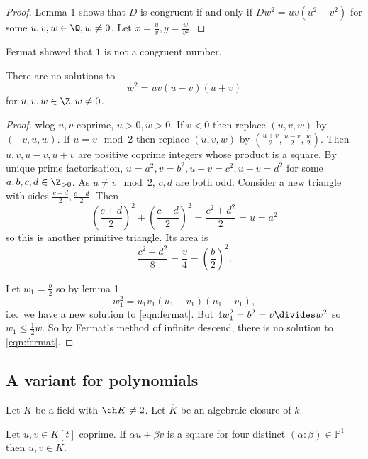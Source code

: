 \documentclass[a4paper]{article}
\theoremstyle{definition}
\renewcommand*{\P}{\mathbb{P}}
\begin{document}
\begin{proof}
  Lemma 1 shows that \(D\) is congruent if and only if \(Dw^2 = uv(u^2 - v^2)\) for some \(u, v, w \in \Q, w \neq 0\). Let \(x = \frac{u}{v}, y = \frac{w}{v^2}\).
\end{proof}

Fermat showed that \(1\) is not a congruent number.

\begin{theorem}
  There are no solutions to
  \begin{equation}
    \label{eqn:fermat}
    w^2 = uv (u - v)(u + v)
    \tag{\ast}
  \end{equation}
  for \(u, v, w \in \Z, w \neq 0\).
\end{theorem}

\begin{proof}
  wlog \(u, v \) coprime, \(u > 0, w > 0\). If \(v < 0\) then replace \((u, v, w)\) by \((-v, u, w)\). If \(u = v \mod 2\) then replace \((u, v, w)\) by \((\frac{u + v}{2}, \frac{u - v}{2}, \frac{w}{2})\). Then \(u, v, u - v, u + v\) are positive coprime integers whose product is a square. By unique prime factorisation, \(u = a^2, v = b^2, u + v = c^2, u - v = d^2\) for some \(a, b, c, d \in \Z_{> 0}\). As \(u \neq v \mod 2\), \(c, d\) are both odd. Consider a new triangle with sides \(\frac{c + d}{2}, \frac{c - d}{2}\). Then
  \[
    \left( \frac{c + d}{2} \right)^2 + \left( \frac{c - d}{2} \right)^2 = \frac{c^2 + d^2}{2} = u = a^2
  \]
  so this is another primitive triangle. Its area is
  \[
    \frac{c^2 - d^2}{8} = \frac{v}{4} = \left( \frac{b}{2} \right)^2.
  \]

  Let \(w_1 = \frac{b}{2}\) so by lemma 1
  \[
    w_1^2 = u_1v_1 (u_1 - v_1)(u_1 + v_1),
  \]
  i.e.\ we have a new solution to \eqref{eqn:fermat}. But \(4 w_1^2 = b^2 = v \divides w^2\) so \(w_1 \leq \frac{1}{2} w\). So by Fermat's method of infinite descend, there is no solution to \eqref{eqn:fermat}.
\end{proof}

\subsection{A variant for polynomials}

Let \(K\) be a field with \(\ch K \neq 2\). Let \(\overline K\) be an algebraic closure of \(k\).

\begin{lemma}
  Let \(u, v \in K[t]\) coprime. If \(\alpha u + \beta v\) is a square for four distinct \((\alpha: \beta) \in \P^1\) then \(u, v \in K\).
\end{lemma}
\end{document}
